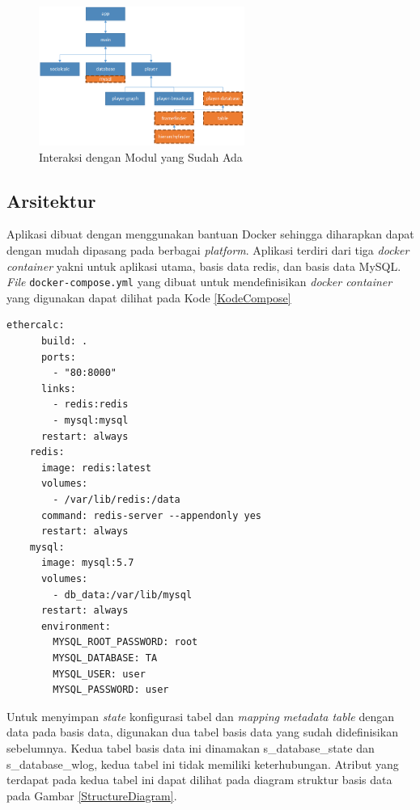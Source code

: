 \begin{figure}[htb]
	\centering
	\includegraphics[width=0.6\textwidth]{resources/chapter-4-module-placing.png}
	\caption{Interaksi dengan Modul yang Sudah Ada}
	\label{ModulePlacing}
\end{figure}

\subsection{Arsitektur}
Aplikasi dibuat dengan menggunakan bantuan Docker sehingga diharapkan dapat dengan mudah dipasang pada berbagai \textit{platform}. Aplikasi terdiri dari tiga \textit{docker container} yakni untuk aplikasi utama, basis data redis, dan basis data MySQL. \textit{File} \texttt{docker-compose.yml} yang dibuat untuk mendefinisikan \textit{docker container} yang digunakan dapat dilihat pada Kode \ref{KodeCompose}

\begin{lstlisting}[frame=single, basicstyle=\linespread{1}\scriptsize\listingsfont, captionpos=b, caption={Kode pada docker-compose.yml}, label=KodeCompose]
	ethercalc:
	  build: .
	  ports:
	    - "80:8000"
	  links:
	    - redis:redis
	    - mysql:mysql
	  restart: always
	redis:
	  image: redis:latest
	  volumes:
	    - /var/lib/redis:/data
	  command: redis-server --appendonly yes
	  restart: always
	mysql:
	  image: mysql:5.7
	  volumes:
	    - db_data:/var/lib/mysql
	  restart: always
	  environment:
	    MYSQL_ROOT_PASSWORD: root
	    MYSQL_DATABASE: TA
	    MYSQL_USER: user
	    MYSQL_PASSWORD: user
	\end{lstlisting}

Untuk menyimpan \textit{state} konfigurasi tabel dan \textit{mapping} \textit{metadata table} dengan data pada basis data, digunakan dua tabel basis data yang sudah didefinisikan sebelumnya. Kedua tabel basis data ini dinamakan s\_database\_state dan s\_database\_wlog, kedua tabel ini tidak memiliki keterhubungan. Atribut yang terdapat pada kedua tabel ini dapat dilihat pada diagram struktur basis data pada Gambar \ref{StructureDiagram}.

